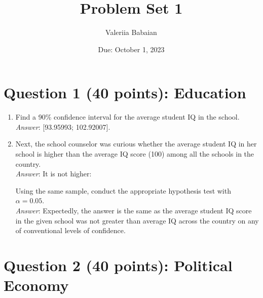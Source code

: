 \documentclass[12pt,letterpaper]{article}
\title{Problem Set 1}
\date{Due: October 1, 2023}
\author{Valeriia Babaian}
\begin{document}
	\maketitle
	

	\vspace{1cm}
	\section*{Question 1 (40 points): Education}


\begin{enumerate}
	\item Find a 90\% confidence interval for the average student IQ in the school.\\
	\textit{Answer}: [93.95993; 102.92007].\\
	\vspace{.3cm}
	
	  
	
	\vspace{.1cm}
	
	\item Next, the school counselor was curious  whether  the average student IQ in her school is higher than the average IQ score (100) among all the schools in the country.\\	\textit{Answer}: It is not higher:\\ 
		\vspace{.1cm}
	
	  
	
	\vspace{.1cm}
	
	
	\noindent Using the same sample, conduct the appropriate hypothesis test with $\alpha=0.05$. \\	\textit{Answer}: Expectedly, the answer is the same as the average student IQ score in the given school was not greater than average IQ across the country on any of conventional levels of confidence.
		\vspace{.3cm}
	
	  
	
	\vspace{.3cm}
\end{enumerate}

\newpage

	\section*{Question 2 (40 points): Political Economy}
\end{document}
